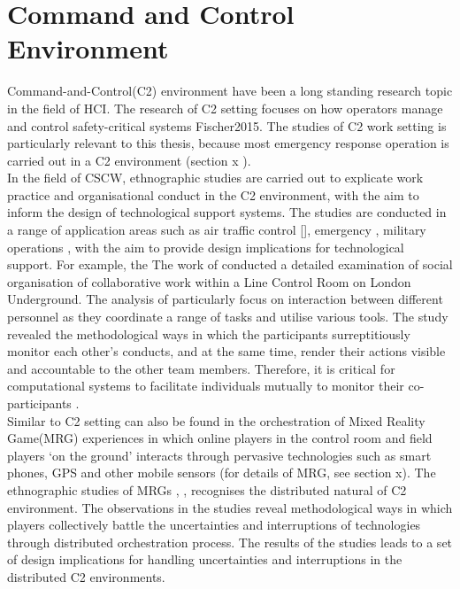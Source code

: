 \section{Command and Control Environment}\label{sec:lrc2}
Command-and-Control(C2) environment have been a long standing research topic in the field of HCI. The  research of C2 setting focuses on how operators manage and control safety-critical systems Fischer2015. The studies of C2 work setting is particularly relevant to this thesis, because most emergency response operation is carried out in a C2 environment (section x ). \\

In the field of CSCW, ethnographic studies are carried out to explicate work practice and organisational conduct in the C2 environment, with the aim to inform the design of technological support systems. The studies are conducted in a range of application areas such as air traffic control [], emergency \cite{Fischer2015} , military operations \cite{Tolcher2005}, with the aim to provide design implications for technological support. For example, the The work of \cite{Heath1992} conducted a detailed examination of social organisation of collaborative work within a Line Control Room on London Underground. The analysis of \cite{Heath1992} particularly focus on interaction between different personnel as they coordinate a range of tasks and utilise various tools. The study revealed the methodological ways in which the participants surreptitiously monitor each other's conducts, and at the same time, render their actions visible and accountable to the other team members. Therefore, it is critical for computational systems to facilitate individuals mutually to monitor their co-participants \cite{Heath1992}.\\

Similar to C2 setting can also be found in the orchestration of Mixed Reality Game(MRG) experiences in which online players in the control room and field players `on the ground' interacts through pervasive technologies such as smart phones, GPS and other mobile sensors (for details of MRG, see section x). The ethnographic studies of MRGs \cite{Benford2006}, \cite{Crabtree2004}, \cite{Koleva2001} recognises the distributed natural of C2 environment. The observations in the studies reveal methodological ways in which players collectively battle the uncertainties and interruptions of technologies through distributed orchestration process. The results of the studies leads to a set of design implications for handling uncertainties and interruptions in the distributed C2 environments. \\

